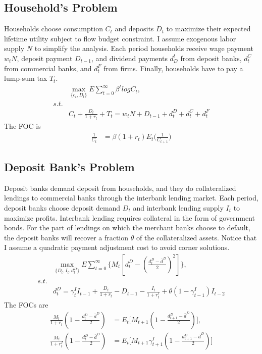 \documentclass[12pt]{article}
\begin{document}
\subsection{Household's Problem}
Households choose consumption $C_t$ and deposits $D_t$ to maximize their expected lifetime utility subject to flow budget constraint. I assume exogenous labor supply $N$ to simplify the analysis.
Each period households receive wage payment $w_tN$, deposit payment $D_{t-1}$, and dividend payments $d^t_D$ from deposit banks, $d_t^C$ from commercial banks, and $d_t^F$ from firms.
Finally, households have to pay a lump-sum tax $T_t$.
\begin{align}
  &\max_{\{c_t, D_t\}} E \sum_{t=0}^{\infty} \beta^t logC_t ,\\
  s.t. \nonumber \\
  &C_t+\frac{D_t}{1+r_t}+T_t=w_tN+D_{t-1}+d_t^D+d_t^C+d_t^F
\end{align}
The FOC is 
\begin{align}
  \frac{1}{C_t}&=\beta (1+r_t)E_t\big(  \frac{1}{C_{t+1}}\big)
\end{align}


\subsection{Deposit Bank's Problem}
Deposit banks demand deposit from households, and they do collateralized lendings to commercial banks through the interbank lending market.
Each period, deposit banks choose deposit demand $D_t$ and interbank lending supply $I_t$ to maximize profits.  Interbank lending requires
collateral in the form of government bonds. For the part of lendings on which the merchant banks choose to default, the deposit banks will recover
a fraction $\theta$ of the collateralized assets. Notice that I assume a quadratic payment adjustment cost to avoid corner solutions.
\begin{align}
  &\max_{\{D_t, I_t, d_t^D\}} E \sum_{t=0}^{\infty} \{M_t[d_t^D-(\frac{d_t^D-\bar{d}^D}{2})^2]\} ,\\
  s.t. \nonumber \\
  &d_t^D=\gamma_t^I I_{t-1}+\frac{D_t}{1+r_t}-D_{t-1}-\frac{I_t}{1+r_t^I}+ \theta(1-\gamma_{t-1}^I)I_{t-2}
\end{align}
The FOCs are 
\begin{align}
  \frac{M_t}{1+r_t}(1-\frac{d_t^D-\bar{d}^D}{2})&=E_t \big[M_{t+1}(1-\frac{d_{t+1}^D-\bar{d}^D}{2})\big], \\
  \frac{M_t}{1+r_t^I}(1-\frac{d_t^D-\bar{d}^D}{2})&=E_t  \big[M_{t+1}\gamma_{t+1}^I (1-\frac{d_{t+1}^D-\bar{d}^D}{2})\big]
\end{align}
\end{document}
